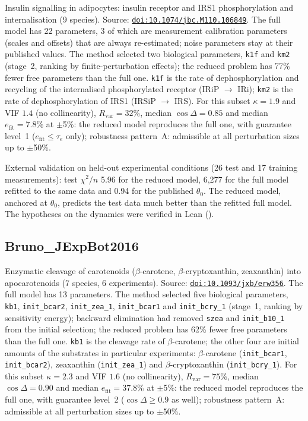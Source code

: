 Insulin signalling in adipocytes: insulin receptor and IRS1 phosphorylation and internalisation (9 species). Source: \href{https://doi.org/10.1074/jbc.M110.106849}{\nolinkurl{doi:10.1074/jbc.M110.106849}}. The full model has 22 parameters, 3 of which are measurement calibration parameters (scales and offsets) that are always re-estimated; noise parameters stay at their published values. The method selected two biological parameters, \texttt{k1f} and \texttt{km2} (stage~2, ranking by finite-perturbation effects); the reduced problem has 77\% fewer free parameters than the full one. \texttt{k1f} is the rate of dephosphorylation and recycling of the internalised phosphorylated receptor (IRiP $\to$ IRi); \texttt{km2} is the rate of dephosphorylation of IRS1 (IRSiP $\to$ IRS). For this subset $\kappa=1.9$ and VIF $1.4$ (no collinearity), $R_{\mathrm{var}}=32\%$, median $\cos\Delta=0.85$ and median $e_{\mathrm{fit}}=7.8\%$ at $\pm$5\%: the reduced model reproduces the full one, with guarantee level~1 ($e_{\mathrm{fit}}\le\tau_e$ only); robustness pattern~A: admissible at all perturbation sizes up to $\pm$50\%.

External validation on held-out experimental conditions (26 test and 17 training measurements): test $\chi^2/n$ 5.96 for the reduced model, 6,277 for the full model refitted to the same data and 0.94 for the published $\theta_0$. The reduced model, anchored at $\theta_0$, predicts the test data much better than the refitted full model. The hypotheses on the dynamics were verified in Lean ().

\subsection*{Bruno\_JExpBot2016}

Enzymatic cleavage of carotenoids ($\beta$-carotene, $\beta$-cryptoxanthin, zeaxanthin) into apocarotenoids (7 species, 6 experiments). Source: \href{https://doi.org/10.1093/jxb/erw356}{\nolinkurl{doi:10.1093/jxb/erw356}}. The full model has 13 parameters. The method selected five biological parameters, \texttt{kb1}, \texttt{init\_bcar2}, \texttt{init\_zea\_1}, \texttt{init\_bcar1} and \texttt{init\_bcry\_1} (stage~1, ranking by sensitivity energy); backward elimination had removed \texttt{szea} and \texttt{init\_b10\_1} from the initial selection; the reduced problem has 62\% fewer free parameters than the full one. \texttt{kb1} is the cleavage rate of $\beta$-carotene; the other four are initial amounts of the substrates in particular experiments: $\beta$-carotene (\texttt{init\_bcar1}, \texttt{init\_bcar2}), zeaxanthin (\texttt{init\_zea\_1}) and $\beta$-cryptoxanthin (\texttt{init\_bcry\_1}). For this subset $\kappa=2.3$ and VIF $1.6$ (no collinearity), $R_{\mathrm{var}}=75\%$, median $\cos\Delta=0.90$ and median $e_{\mathrm{fit}}=37.8\%$ at $\pm$5\%: the reduced model reproduces the full one, with guarantee level~2 ($\cos\Delta\ge0.9$ as well); robustness pattern~A: admissible at all perturbation sizes up to $\pm$50\%.

